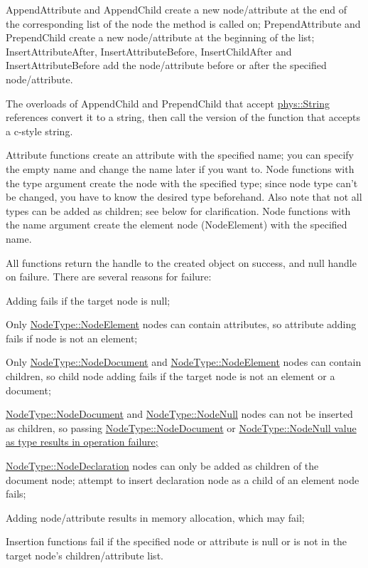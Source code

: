  AppendAttribute and AppendChild create a new node/attribute at the end of the corresponding list of the node the method is called on; PrependAttribute and PrependChild create a new node/attribute at the beginning of the list; InsertAttributeAfter, InsertAttributeBefore, InsertChildAfter and InsertAttributeBefore add the node/attribute before or after the specified node/attribute. \par
 \par
 The overloads of AppendChild and PrependChild that accept \hyperlink{namespacephys_aa03900411993de7fbfec4789bc1d392e}{phys::String} references convert it to a string, then call the version of the function that accepts a c-\/style string. \par
 \par
 Attribute functions create an attribute with the specified name; you can specify the empty name and change the name later if you want to. Node functions with the type argument create the node with the specified type; since node type can't be changed, you have to know the desired type beforehand. Also note that not all types can be added as children; see below for clarification. Node functions with the name argument create the element node (NodeElement) with the specified name. \par
 \par
 All functions return the handle to the created object on success, and null handle on failure. There are several reasons for failure:
\begin{DoxyItemize}
\item Adding fails if the target node is null;
\item Only \hyperlink{namespacephys_1_1xml_a668b0cc666a9d49f7c7222a7552115d3}{NodeType::NodeElement} nodes can contain attributes, so attribute adding fails if node is not an element;
\item Only \hyperlink{namespacephys_1_1xml_a668b0cc666a9d49f7c7222a7552115d3}{NodeType::NodeDocument} and \hyperlink{namespacephys_1_1xml_a668b0cc666a9d49f7c7222a7552115d3}{NodeType::NodeElement} nodes can contain children, so child node adding fails if the target node is not an element or a document;
\item \hyperlink{namespacephys_1_1xml_a668b0cc666a9d49f7c7222a7552115d3}{NodeType::NodeDocument} and \hyperlink{namespacephys_1_1xml_a668b0cc666a9d49f7c7222a7552115d3}{NodeType::NodeNull} nodes can not be inserted as children, so passing \hyperlink{namespacephys_1_1xml_a668b0cc666a9d49f7c7222a7552115d3}{NodeType::NodeDocument} or \hyperlink{namespacephys_1_1xml_a668b0cc666a9d49f7c7222a7552115d3}{NodeType::NodeNull value as type results in operation failure;}
\item \hyperlink{namespacephys_1_1xml_a668b0cc666a9d49f7c7222a7552115d3}{NodeType::NodeDeclaration} nodes can only be added as children of the document node; attempt to insert declaration node as a child of an element node fails;
\item Adding node/attribute results in memory allocation, which may fail;
\item Insertion functions fail if the specified node or attribute is null or is not in the target node's children/attribute list.
\end{DoxyItemize}

